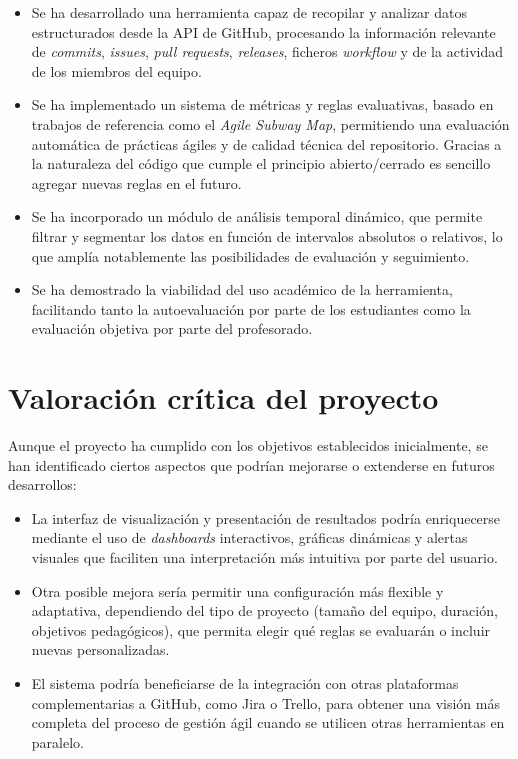 \begin{itemize}
\item Se ha desarrollado una herramienta capaz de recopilar y analizar datos estructurados desde la API de GitHub, procesando la información relevante de \textit{commits}, \textit{issues}, \textit{pull requests}, \textit{releases}, ficheros \textit{workflow} y de la actividad de los miembros del equipo.
\item Se ha implementado un sistema de métricas y reglas evaluativas, basado en trabajos de referencia como el \textit{Agile Subway Map}, permitiendo una evaluación automática de prácticas ágiles y de calidad técnica del repositorio. Gracias a la naturaleza del código que cumple el principio abierto/cerrado es sencillo agregar nuevas reglas en el futuro.
\item Se ha incorporado un módulo de análisis temporal dinámico, que permite filtrar y segmentar los datos en función de intervalos absolutos o relativos, lo que amplía notablemente las posibilidades de evaluación y seguimiento.
\item Se ha demostrado la viabilidad del uso académico de la herramienta, facilitando tanto la autoevaluación por parte de los estudiantes como la evaluación objetiva por parte del profesorado.
\end{itemize}

\section*{Valoración crítica del proyecto}

Aunque el proyecto ha cumplido con los objetivos establecidos inicialmente, se han identificado ciertos aspectos que podrían mejorarse o extenderse en futuros desarrollos:

\begin{itemize}
\item La interfaz de visualización y presentación de resultados podría enriquecerse mediante el uso de \textit{dashboards} interactivos, gráficas dinámicas y alertas visuales que faciliten una interpretación más intuitiva por parte del usuario.
\item Otra posible mejora sería permitir una configuración más flexible y adaptativa, dependiendo del tipo de proyecto (tamaño del equipo, duración, objetivos pedagógicos), que permita elegir qué reglas se evaluarán o incluir nuevas personalizadas.
\item El sistema podría beneficiarse de la integración con otras plataformas complementarias a GitHub, como Jira o Trello, para obtener una visión más completa del proceso de gestión ágil cuando se utilicen otras herramientas en paralelo.
\end{itemize}

